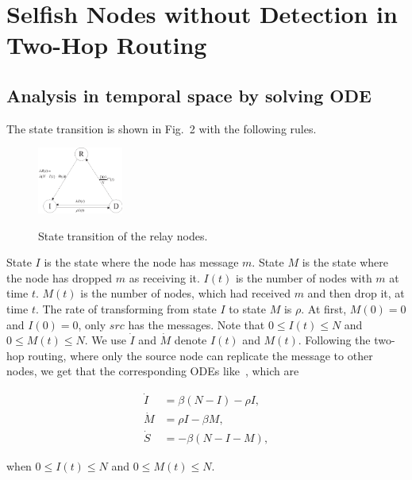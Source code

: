 \section{Selfish Nodes without Detection in Two-Hop Routing}
\label{sec:wo_detect}
\subsection{Analysis in temporal space by solving ODE}
The state transition is shown
in Fig.~2 with the following rules.
\begin{figure}
  \centering
  {\includegraphics[width=0.25\textwidth]
  {fig/state_transition_detect.eps}}
     \caption{State transition of the relay nodes.}
     \label{fig:ss_dt}
\end{figure}

State $I$ is the state where the node has message $m$.
State $M$ is the state where the node has dropped $m$ as receiving it.
$I(t)$ is the number of nodes with $m$ at time $t$.
$M(t)$ is the number of nodes, which had received $m$ and then drop it, at time $t$.
The rate of transforming from state $I$ to state $M$ is $\rho$.
At first, $M(0)=0$ and $I(0)=0$, only $src$ has the messages.
Note that $0 \le I(t) \le N$ and $0 \le M(t) \le N$.
We use $\dot{I}$ and $\dot{M}$ denote $I(t)$ and $M(t)$.
Following the two-hop routing,
where only the source node can replicate the message to other nodes,
we get that the corresponding ODEs like~\cite{CC2007PerfAnaly}, which are
\begin{small}
\begin{equation}
\nonumber
\begin{aligned}
\dot{I} &= \beta (N-I) - \rho I,\\
\dot{M} &= \rho I - \beta M,\\
\dot{S} &= - \beta (N-I-M),
\end{aligned}
\end{equation}
\end{small}
when $0 \le I(t) \le N$ and $0 \le M(t) \le N$.

